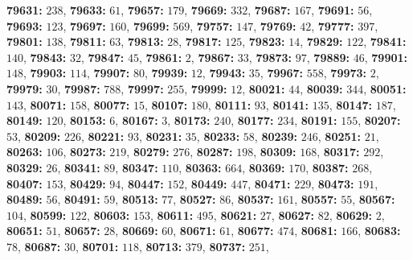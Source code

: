\textsf{\bfseries 79631:} $238$, \textsf{\bfseries 79633:} $61$, \textsf{\bfseries 79657:} $179$, \textsf{\bfseries 79669:} $332$, \textsf{\bfseries 79687:} $167$, \textsf{\bfseries 79691:} $56$, \textsf{\bfseries 79693:} $123$, \textsf{\bfseries 79697:} $160$, \textsf{\bfseries 79699:} $569$, \textsf{\bfseries 79757:} $147$, \textsf{\bfseries 79769:} $42$, \textsf{\bfseries 79777:} $397$, \textsf{\bfseries 79801:} $138$, \textsf{\bfseries 79811:} $63$, \textsf{\bfseries 79813:} $28$, \textsf{\bfseries 79817:} $125$, \textsf{\bfseries 79823:} $14$, \textsf{\bfseries 79829:} $122$, \textsf{\bfseries 79841:} $140$, \textsf{\bfseries 79843:} $32$, \textsf{\bfseries 79847:} $45$, \textsf{\bfseries 79861:} $2$, \textsf{\bfseries 79867:} $33$, \textsf{\bfseries 79873:} $97$, \textsf{\bfseries 79889:} $46$, \textsf{\bfseries 79901:} $148$, \textsf{\bfseries 79903:} $114$, \textsf{\bfseries 79907:} $80$, \textsf{\bfseries 79939:} $12$, \textsf{\bfseries 79943:} $35$, \textsf{\bfseries 79967:} $558$, \textsf{\bfseries 79973:} $2$, \textsf{\bfseries 79979:} $30$, \textsf{\bfseries 79987:} $788$, \textsf{\bfseries 79997:} $255$, \textsf{\bfseries 79999:} $12$, \textsf{\bfseries 80021:} $44$, \textsf{\bfseries 80039:} $344$, \textsf{\bfseries 80051:} $143$, \textsf{\bfseries 80071:} $158$, \textsf{\bfseries 80077:} $15$, \textsf{\bfseries 80107:} $180$, \textsf{\bfseries 80111:} $93$, \textsf{\bfseries 80141:} $135$, \textsf{\bfseries 80147:} $187$, \textsf{\bfseries 80149:} $120$, \textsf{\bfseries 80153:} $6$, \textsf{\bfseries 80167:} $3$, \textsf{\bfseries 80173:} $240$, \textsf{\bfseries 80177:} $234$, \textsf{\bfseries 80191:} $155$, \textsf{\bfseries 80207:} $53$, \textsf{\bfseries 80209:} $226$, \textsf{\bfseries 80221:} $93$, \textsf{\bfseries 80231:} $35$, \textsf{\bfseries 80233:} $58$, \textsf{\bfseries 80239:} $246$, \textsf{\bfseries 80251:} $21$, \textsf{\bfseries 80263:} $106$, \textsf{\bfseries 80273:} $219$, \textsf{\bfseries 80279:} $276$, \textsf{\bfseries 80287:} $198$, \textsf{\bfseries 80309:} $168$, \textsf{\bfseries 80317:} $292$, \textsf{\bfseries 80329:} $26$, \textsf{\bfseries 80341:} $89$, \textsf{\bfseries 80347:} $110$, \textsf{\bfseries 80363:} $664$, \textsf{\bfseries 80369:} $170$, \textsf{\bfseries 80387:} $268$, \textsf{\bfseries 80407:} $153$, \textsf{\bfseries 80429:} $94$, \textsf{\bfseries 80447:} $152$, \textsf{\bfseries 80449:} $447$, \textsf{\bfseries 80471:} $229$, \textsf{\bfseries 80473:} $191$, \textsf{\bfseries 80489:} $56$, \textsf{\bfseries 80491:} $59$, \textsf{\bfseries 80513:} $77$, \textsf{\bfseries 80527:} $86$, \textsf{\bfseries 80537:} $161$, \textsf{\bfseries 80557:} $55$, \textsf{\bfseries 80567:} $104$, \textsf{\bfseries 80599:} $122$, \textsf{\bfseries 80603:} $153$, \textsf{\bfseries 80611:} $495$, \textsf{\bfseries 80621:} $27$, \textsf{\bfseries 80627:} $82$, \textsf{\bfseries 80629:} $2$, \textsf{\bfseries 80651:} $51$, \textsf{\bfseries 80657:} $28$, \textsf{\bfseries 80669:} $60$, \textsf{\bfseries 80671:} $61$, \textsf{\bfseries 80677:} $474$, \textsf{\bfseries 80681:} $166$, \textsf{\bfseries 80683:} $78$, \textsf{\bfseries 80687:} $30$, \textsf{\bfseries 80701:} $118$, \textsf{\bfseries 80713:} $379$, \textsf{\bfseries 80737:} $251$, 
